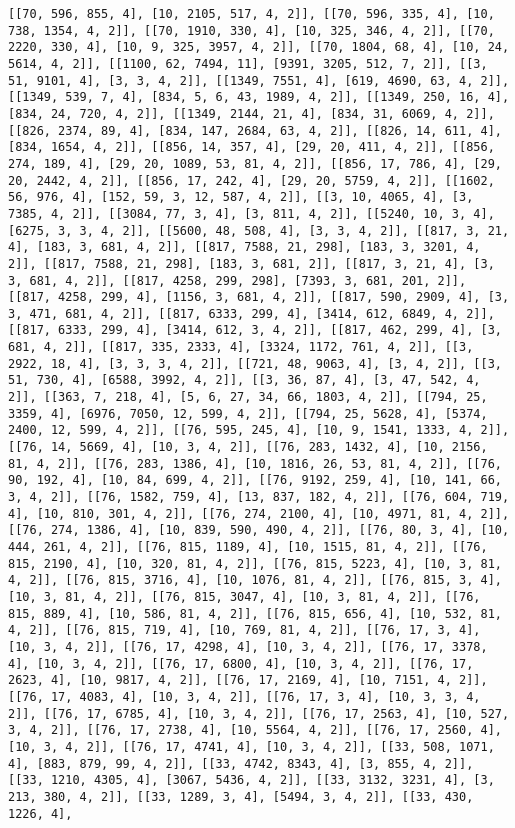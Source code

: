 \documentclass[12pt,fleqn]{article}\usepackage{../../common}
\begin{document}
\begin{verbatim}
[[70, 596, 855, 4], [10, 2105, 517, 4, 2]], [[70, 596, 335, 4], [10, 738, 1354, 4, 2]], [[70, 1910, 330, 4], [10, 325, 346, 4, 2]], [[70, 2220, 330, 4], [10, 9, 325, 3957, 4, 2]], [[70, 1804, 68, 4], [10, 24, 5614, 4, 2]], [[1100, 62, 7494, 11], [9391, 3205, 512, 7, 2]], [[3, 51, 9101, 4], [3, 3, 4, 2]], [[1349, 7551, 4], [619, 4690, 63, 4, 2]], [[1349, 539, 7, 4], [834, 5, 6, 43, 1989, 4, 2]], [[1349, 250, 16, 4], [834, 24, 720, 4, 2]], [[1349, 2144, 21, 4], [834, 31, 6069, 4, 2]], [[826, 2374, 89, 4], [834, 147, 2684, 63, 4, 2]], [[826, 14, 611, 4], [834, 1654, 4, 2]], [[856, 14, 357, 4], [29, 20, 411, 4, 2]], [[856, 274, 189, 4], [29, 20, 1089, 53, 81, 4, 2]], [[856, 17, 786, 4], [29, 20, 2442, 4, 2]], [[856, 17, 242, 4], [29, 20, 5759, 4, 2]], [[1602, 56, 976, 4], [152, 59, 3, 12, 587, 4, 2]], [[3, 10, 4065, 4], [3, 7385, 4, 2]], [[3084, 77, 3, 4], [3, 811, 4, 2]], [[5240, 10, 3, 4], [6275, 3, 3, 4, 2]], [[5600, 48, 508, 4], [3, 3, 4, 2]], [[817, 3, 21, 4], [183, 3, 681, 4, 2]], [[817, 7588, 21, 298], [183, 3, 3201, 4, 2]], [[817, 7588, 21, 298], [183, 3, 681, 2]], [[817, 3, 21, 4], [3, 3, 681, 4, 2]], [[817, 4258, 299, 298], [7393, 3, 681, 201, 2]], [[817, 4258, 299, 4], [1156, 3, 681, 4, 2]], [[817, 590, 2909, 4], [3, 3, 471, 681, 4, 2]], [[817, 6333, 299, 4], [3414, 612, 6849, 4, 2]], [[817, 6333, 299, 4], [3414, 612, 3, 4, 2]], [[817, 462, 299, 4], [3, 681, 4, 2]], [[817, 335, 2333, 4], [3324, 1172, 761, 4, 2]], [[3, 2922, 18, 4], [3, 3, 3, 4, 2]], [[721, 48, 9063, 4], [3, 4, 2]], [[3, 51, 730, 4], [6588, 3992, 4, 2]], [[3, 36, 87, 4], [3, 47, 542, 4, 2]], [[363, 7, 218, 4], [5, 6, 27, 34, 66, 1803, 4, 2]], [[794, 25, 3359, 4], [6976, 7050, 12, 599, 4, 2]], [[794, 25, 5628, 4], [5374, 2400, 12, 599, 4, 2]], [[76, 595, 245, 4], [10, 9, 1541, 1333, 4, 2]], [[76, 14, 5669, 4], [10, 3, 4, 2]], [[76, 283, 1432, 4], [10, 2156, 81, 4, 2]], [[76, 283, 1386, 4], [10, 1816, 26, 53, 81, 4, 2]], [[76, 90, 192, 4], [10, 84, 699, 4, 2]], [[76, 9192, 259, 4], [10, 141, 66, 3, 4, 2]], [[76, 1582, 759, 4], [13, 837, 182, 4, 2]], [[76, 604, 719, 4], [10, 810, 301, 4, 2]], [[76, 274, 2100, 4], [10, 4971, 81, 4, 2]], [[76, 274, 1386, 4], [10, 839, 590, 490, 4, 2]], [[76, 80, 3, 4], [10, 444, 261, 4, 2]], [[76, 815, 1189, 4], [10, 1515, 81, 4, 2]], [[76, 815, 2190, 4], [10, 320, 81, 4, 2]], [[76, 815, 5223, 4], [10, 3, 81, 4, 2]], [[76, 815, 3716, 4], [10, 1076, 81, 4, 2]], [[76, 815, 3, 4], [10, 3, 81, 4, 2]], [[76, 815, 3047, 4], [10, 3, 81, 4, 2]], [[76, 815, 889, 4], [10, 586, 81, 4, 2]], [[76, 815, 656, 4], [10, 532, 81, 4, 2]], [[76, 815, 719, 4], [10, 769, 81, 4, 2]], [[76, 17, 3, 4], [10, 3, 4, 2]], [[76, 17, 4298, 4], [10, 3, 4, 2]], [[76, 17, 3378, 4], [10, 3, 4, 2]], [[76, 17, 6800, 4], [10, 3, 4, 2]], [[76, 17, 2623, 4], [10, 9817, 4, 2]], [[76, 17, 2169, 4], [10, 7151, 4, 2]], [[76, 17, 4083, 4], [10, 3, 4, 2]], [[76, 17, 3, 4], [10, 3, 3, 4, 2]], [[76, 17, 6785, 4], [10, 3, 4, 2]], [[76, 17, 2563, 4], [10, 527, 3, 4, 2]], [[76, 17, 2738, 4], [10, 5564, 4, 2]], [[76, 17, 2560, 4], [10, 3, 4, 2]], [[76, 17, 4741, 4], [10, 3, 4, 2]], [[33, 508, 1071, 4], [883, 879, 99, 4, 2]], [[33, 4742, 8343, 4], [3, 855, 4, 2]], [[33, 1210, 4305, 4], [3067, 5436, 4, 2]], [[33, 3132, 3231, 4], [3, 213, 380, 4, 2]], [[33, 1289, 3, 4], [5494, 3, 4, 2]], [[33, 430, 1226, 4], 
\end{verbatim}
\end{document}
